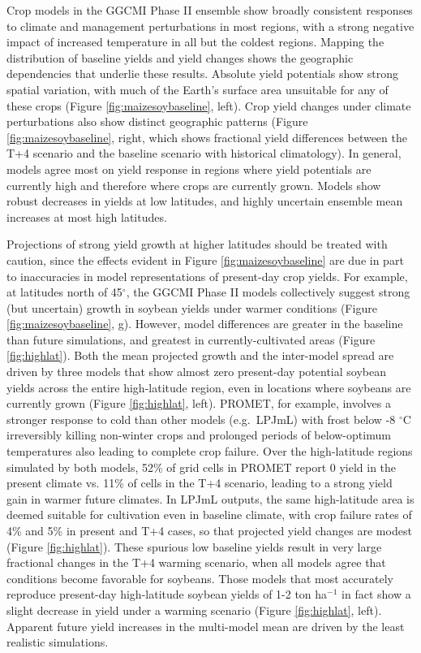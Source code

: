 \documentclass[gmd, manuscript]{copernicus} %
\begin{document}
Crop models in the GGCMI Phase II ensemble show broadly consistent responses to climate and management perturbations in most regions, with a strong negative impact of increased temperature in all but the coldest regions. 
Mapping the distribution of baseline yields and yield changes shows the geographic dependencies that underlie these results. 
Absolute yield potentials show strong spatial variation, with much of the Earth's surface area unsuitable for any of these crops (Figure \ref{fig:maizesoybaseline}, left).
Crop yield changes under climate perturbations also show distinct geographic patterns (Figure \ref{fig:maizesoybaseline}, right, which shows fractional yield differences between the T+4 scenario and the baseline scenario with historical climatology).
In general, models agree most on yield response in regions where yield potentials are currently high and therefore where crops are currently grown. 
Models show robust decreases in yields at low latitudes, and highly uncertain ensemble mean increases at most high latitudes.

Projections of strong yield growth at higher latitudes should be treated with caution, since the effects evident in Figure \ref{fig:maizesoybaseline} are due in part to inaccuracies in model representations of present-day crop yields. 
For example, at latitudes north of 45$^\circ$, the GGCMI Phase II models collectively suggest strong (but uncertain) growth in soybean yields under warmer conditions (Figure \ref{fig:maizesoybaseline}, g). 
However, model differences are greater in the baseline than future simulations, and greatest in currently-cultivated areas (Figure \ref{fig:highlat}). 
Both the mean projected growth and the inter-model spread are driven by three models that show almost zero present-day potential soybean yields across the entire high-latitude region, even in locations where soybeans are currently grown (Figure \ref{fig:highlat}, left).
PROMET, for example, involves a stronger response to cold than other models (e.g.\ LPJmL) with frost below -8 $^\circ$C irreversibly killing non-winter crops and prolonged periods of below-optimum temperatures also leading to complete crop failure. 
Over the high-latitude regions simulated by both models, 52\% of grid cells in PROMET report 0 yield in the present climate vs. 
11\% of cells in the T+4 scenario, leading to a strong yield gain in warmer future climates. 
In LPJmL outputs, the same high-latitude area is deemed suitable for cultivation even in baseline climate, with crop failure rates of 4\% and 5\% in present and T+4 cases, so that projected yield changes are modest (Figure \ref{fig:highlat}).
These spurious low baseline yields result in very large fractional changes in the T+4 warming scenario, when all models agree that conditions become favorable for soybeans. 
Those models that most accurately reproduce present-day high-latitude soybean yields of 1-2 ton ha$^{-1}$ \citep{Ray2012} in fact show a slight decrease in yield under a warming scenario (Figure \ref{fig:highlat}, left). 
Apparent future yield increases in the multi-model mean are driven by the least realistic simulations.
\end{document}
